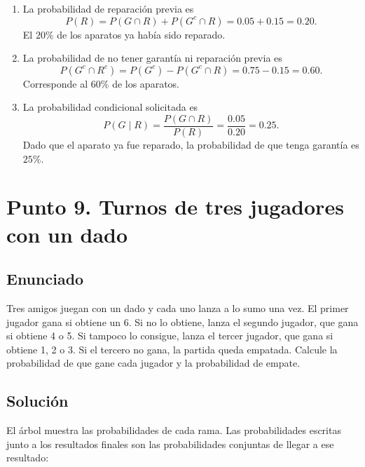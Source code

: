 \documentclass[12pt]{article}
\begin{document}
\begin{enumerate}
    \item La probabilidad de reparación previa es
    \[
    P(R)=P(G\cap R)+P(G^c\cap R)=0.05+0.15=0.20.
    \]
    El $20\%$ de los aparatos ya había sido reparado.
    \item La probabilidad de no tener garantía ni reparación previa es
    \[
    P(G^c\cap R^c)=P(G^c)-P(G^c\cap R)=0.75-0.15=0.60.
    \]
    Corresponde al $60\%$ de los aparatos.
    \item La probabilidad condicional solicitada es
    \[
    P(G\mid R)=\frac{P(G\cap R)}{P(R)}=\frac{0.05}{0.20}=0.25.
    \]
    Dado que el aparato ya fue reparado, la probabilidad de que tenga garantía es $25\%$.
\end{enumerate}



\section*{Punto 9. Turnos de tres jugadores con un dado}

\subsection*{Enunciado}

Tres amigos juegan con un dado y cada uno lanza a lo sumo una vez. El primer jugador gana si obtiene un 6. Si no lo obtiene, lanza el segundo jugador, que gana si obtiene 4 o 5. Si tampoco lo consigue, lanza el tercer jugador, que gana si obtiene 1, 2 o 3. Si el tercero no gana, la partida queda empatada. Calcule la probabilidad de que gane cada jugador y la probabilidad de empate.

\subsection*{Solución}

El árbol muestra las probabilidades de cada rama. Las probabilidades escritas junto a los resultados finales son las probabilidades conjuntas de llegar a ese resultado:
\end{document}
